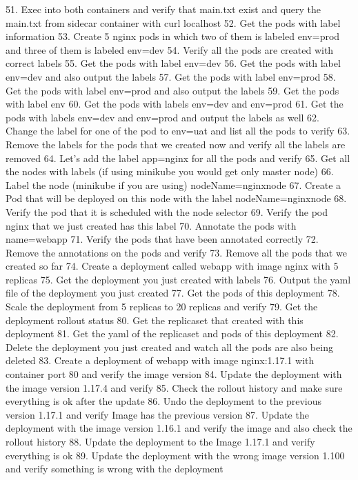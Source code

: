 51. Exec into both containers and verify that main.txt exist and query the main.txt from sidecar container with curl localhost
52. Get the pods with label information
53. Create 5 nginx pods in which two of them is labeled env=prod and three of them is labeled env=dev
54. Verify all the pods are created with correct labels
55. Get the pods with label env=dev
56. Get the pods with label env=dev and also output the labels
57. Get the pods with label env=prod
58. Get the pods with label env=prod and also output the labels
59. Get the pods with label env
60. Get the pods with labels env=dev and env=prod
61. Get the pods with labels env=dev and env=prod and output the labels as well
62. Change the label for one of the pod to env=uat and list all the pods to verify
63. Remove the labels for the pods that we created now and verify all the labels are removed
64. Let’s add the label app=nginx for all the pods and verify
65. Get all the nodes with labels (if using minikube you would get only master node)
66. Label the node (minikube if you are using) nodeName=nginxnode
67. Create a Pod that will be deployed on this node with the label nodeName=nginxnode
68. Verify the pod that it is scheduled with the node selector
69. Verify the pod nginx that we just created has this label
70. Annotate the pods with name=webapp
71. Verify the pods that have been annotated correctly
72. Remove the annotations on the pods and verify
73. Remove all the pods that we created so far
74. Create a deployment called webapp with image nginx with 5 replicas
75. Get the deployment you just created with labels
76. Output the yaml file of the deployment you just created
77. Get the pods of this deployment
78. Scale the deployment from 5 replicas to 20 replicas and verify
79. Get the deployment rollout status
80. Get the replicaset that created with this deployment
81. Get the yaml of the replicaset and pods of this deployment
82. Delete the deployment you just created and watch all the pods are also being deleted
83. Create a deployment of webapp with image nginx:1.17.1 with container port 80 and verify the image version
84. Update the deployment with the image version 1.17.4 and verify
85. Check the rollout history and make sure everything is ok after the update
86. Undo the deployment to the previous version 1.17.1 and verify Image has the previous version
87. Update the deployment with the image version 1.16.1 and verify the image and also check the rollout history
88. Update the deployment to the Image 1.17.1 and verify everything is ok
89. Update the deployment with the wrong image version 1.100 and verify something is wrong with the deployment
